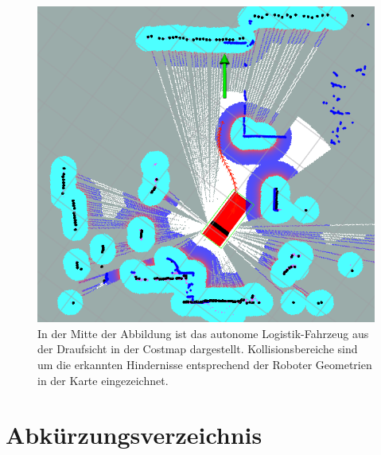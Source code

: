 \documentclass[12pt,a4paper,oneside,numbers=noenddot,headsepline,captions=tableheading,toc=bibliography,openany,tikz,margin=5mm]{scrbook}
\begin{document}
\begin{titlepage}
\begin{figure}[H]
	\includegraphics[width=\columnwidth]{trajektorie}
	\centering
	
	\caption{In der Mitte der Abbildung ist das autonome Logistik-Fahrzeug aus der Draufsicht in der Costmap dargestellt. Kollisionsbereiche sind um die erkannten Hindernisse entsprechend der Roboter Geometrien in der Karte eingezeichnet.}
	\label{fig: trajektorie}
\end{figure}




		
\end{titlepage}
\onehalfspacing
\cleardoublepage
%
\cleardoublepage
 
 \tableofcontents
 \cleardoublepage

\chapter*{Abkürzungsverzeichnis}
\end{document}
